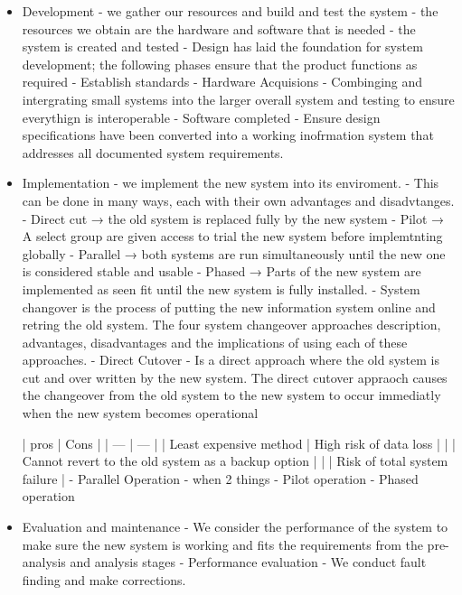 \documentclass[12pt, a4, twoside]{article}
\begin{document}
\begin{itemize}
\begin{itemize}
\begin{itemize}
      \end{itemize}
      \item Development
      - we gather our resources and build and test the system
          - the resources we obtain are the hardware and software that is needed
          - the system is created and tested
      - Design has laid the foundation for system development; the following phases ensure that the product functions as required
          - Establish standards
          - Hardware Acquisions
          - Combinging and intergrating small systems into the larger overall system and testing to ensure everythign is interoperable
          - Software completed
          - Ensure design specifications have been converted into a working inofrmation system that addresses all documented system requirements.
      \item Implementation
      - we implement the new system into its enviroment.
          - This can be done in many ways, each with their own advantages and disadvtanges.
              - Direct cut → the old system is replaced fully by the new system
              - Pilot → A select group are given access to trial the new system before implemtnting globally
              - Parallel → both systems are run simultaneously until the new one is considered stable and usable
              - Phased → Parts of the new system are implemented as seen fit until the new system is fully installed.
      - System changover is the process of putting the new information system online and retring the old system. The four system changeover approaches description, advantages, disadvantages and the implications of using each of these approaches.
          - Direct Cutover
              - Is a direct approach where the old system is cut and over written by the new system. The direct cutover appraoch causes the changeover from the old system to the new system to occur immediatly when the new system becomes operational
              
              | pros | Cons |
              | --- | --- |
              | Least expensive method  | High risk of data loss  |
              |  | Cannot revert to the old system as a backup option  |
              |  | Risk of total system failure  |
          - Parallel Operation
              - when 2 things
          - Pilot operation
          - Phased operation
      \item Evaluation and maintenance
      - We consider the performance of the system to make sure the new system is working and fits the requirements from the pre-analysis and analysis stages
          - Performance evaluation
      - We conduct fault finding and make corrections.
      
    \end{itemize}
  \end{itemize}
\end{document}
